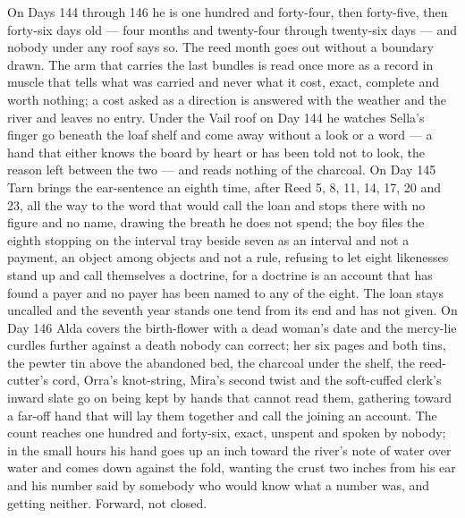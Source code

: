 \documentclass{design/chronicle}
\begin{document}
{On Days 144 through 146 he is one hundred and forty-four, then forty-five, then forty-six days old — four months and twenty-four through twenty-six days — and nobody under any roof says so. The reed month goes out without a boundary drawn. The arm that carries the last bundles is read once more as a record in muscle that tells what was carried and never what it cost, exact, complete and worth nothing; a cost asked as a direction is answered with the weather and the river and leaves no entry. Under the Vail roof on Day 144 he watches Sella’s finger go beneath the loaf shelf and come away without a look or a word — a hand that either knows the board by heart or has been told not to look, the reason left between the two — and reads nothing of the charcoal. On Day 145 Tarn brings the ear-sentence an eighth time, after Reed 5, 8, 11, 14, 17, 20 and 23, all the way to the word that would call the loan and stops there with no figure and no name, drawing the breath he does not spend; the boy files the eighth stopping on the interval tray beside seven as an interval and not a payment, an object among objects and not a rule, refusing to let eight likenesses stand up and call themselves a doctrine, for a doctrine is an account that has found a payer and no payer has been named to any of the eight. The loan stays uncalled and the seventh year stands one tend from its end and has not given. On Day 146 Alda covers the birth-flower with a dead woman’s date and the mercy-lie curdles further against a death nobody can correct; her six pages and both tins, the pewter tin above the abandoned bed, the charcoal under the shelf, the reed-cutter’s cord, Orra’s knot-string, Mira’s second twist and the soft-cuffed clerk’s inward slate go on being kept by hands that cannot read them, gathering toward a far-off hand that will lay them together and call the joining an account. The count reaches one hundred and forty-six, exact, unspent and spoken by nobody; in the small hours his hand goes up an inch toward the river’s note of water over water and comes down against the fold, wanting the crust two inches from his ear and his number said by somebody who would know what a number was, and getting neither. Forward, not closed.

}
\end{document}
